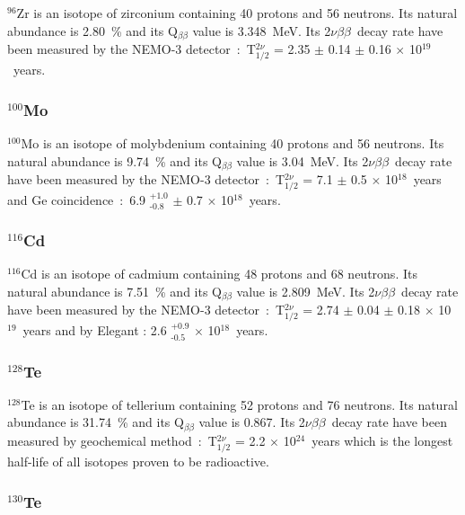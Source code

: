 \documentclass[main.tex]{subfiles}
\begin{document}
\NI $^\text{96}$Zr is an isotope of zirconium containing 40 protons and 56 neutrons. Its natural abundance is 2.80~\% and its Q$_{\beta\beta}$ value is 3.348~MeV. Its 2$\nu\beta\beta$~decay rate have been measured by the NEMO-3 detector~:~T$_{\text{1/2}}^{\text{2}\nu}$ = 2.35 $\pm$ 0.14 $\pm$ 0.16 $\times$ 10$^{\text{19}}$~years.


\subsubsection{$^{\text{100}}$Mo}


\NI $^\text{100}$Mo is an isotope of molybdenium containing 40 protons and 56 neutrons. Its natural abundance is 9.74~\% and its Q$_{\beta\beta}$ value is 3.04~MeV. Its 2$\nu\beta\beta$~decay rate have been measured by the NEMO-3 detector~:~T$_{\text{1/2}}^{\text{2}\nu}$ = 7.1 $\pm$ 0.5 $\times$ 10$^{\text{18}}$~years and Ge coincidence~:~6.9 $^{\text{+1.0}}_{\text{-0.8}}$ $\pm$ 0.7 $\times$ 10$^{\text{18}}$~years.


\subsubsection{$^{\text{116}}$Cd}


\NI $^\text{116}$Cd is an isotope of cadmium containing 48 protons and 68 neutrons. Its natural abundance is 7.51~\% and its Q$_{\beta\beta}$ value is 2.809~MeV. Its 2$\nu\beta\beta$~decay rate have been measured by the NEMO-3 detector~:~T$_{\text{1/2}}^{\text{2}\nu}$ = 2.74 $\pm$ 0.04 $\pm$ 0.18 $\times$ 10$^{\text{19}}$~years and by Elegant : 2.6 $^{\text{+0.9}}_{\text{-0.5}}$ $\times$ 10$^{\text{18}}$~years.


\subsubsection{$^{\text{128}}$Te}


\NI $^\text{128}$Te is an isotope of tellerium containing 52 protons and 76 neutrons. Its natural abundance is 31.74~\% and its Q$_{\beta\beta}$ value is 0.867. Its 2$\nu\beta\beta$~decay rate have been measured by geochemical method~:~T$_{\text{1/2}}^{\text{2}\nu}$ = 2.2 $\times$ 10$^{\text{24}}$~years which is the longest half-life of all isotopes proven to be radioactive.


\subsubsection{$^{\text{130}}$Te}
\end{document}
